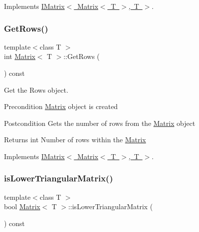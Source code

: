 Implements \mbox{\hyperlink{class_i_matrix}{I\+Matrix$<$ Matrix$<$ T $>$, T $>$}}.

\mbox{\label{class_matrix_aa665db4bc173a7bb4ec3f9da2676dfa6}} 
\subsubsection{\texorpdfstring{GetRows()}{GetRows()}}
{\footnotesize\ttfamily template$<$class T $>$ \\
int \mbox{\hyperlink{class_matrix}{Matrix}}$<$ T $>$\+::Get\+Rows (\begin{DoxyParamCaption}{ }\end{DoxyParamCaption}) const\hspace{0.3cm}{\ttfamily [virtual]}}



Get the Rows object. 

\begin{DoxyPrecond}{Precondition}
\mbox{\hyperlink{class_matrix}{Matrix}} object is created 
\end{DoxyPrecond}
\begin{DoxyPostcond}{Postcondition}
Gets the number of rows from the \mbox{\hyperlink{class_matrix}{Matrix}} object 
\end{DoxyPostcond}
\begin{DoxyReturn}{Returns}
int Number of rows within the \mbox{\hyperlink{class_matrix}{Matrix}} 
\end{DoxyReturn}


Implements \mbox{\hyperlink{class_i_matrix}{I\+Matrix$<$ Matrix$<$ T $>$, T $>$}}.

\mbox{\label{class_matrix_a6e1df160cc8cb63f5b0bb58398b6e7ca}} 
\subsubsection{\texorpdfstring{isLowerTriangularMatrix()}{isLowerTriangularMatrix()}}
{\footnotesize\ttfamily template$<$class T $>$ \\
bool \mbox{\hyperlink{class_matrix}{Matrix}}$<$ T $>$\+::is\+Lower\+Triangular\+Matrix (\begin{DoxyParamCaption}{ }\end{DoxyParamCaption}) const}



